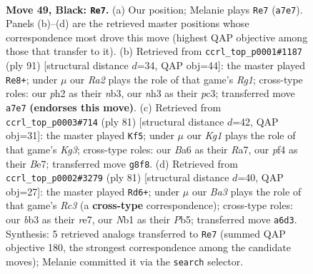 \documentclass[11pt]{article}
\begin{document}
\clearpage

\begin{figure}[p]\centering
\begin{subfigure}{0.46\textwidth}\centering
\resizebox{\linewidth}{!}{%
\newchessgame
\chessboard[
  setfen={6k1/r4p1p/b5p1/4Pp2/5P2/1B5N/P5PP/1n2K3 b - - 7 49},
  showmover=false,
  pgfstyle=straightmove, color=movearrow, markmove={a7-e7}
]}
\caption{}
\end{subfigure}\hfill
\begin{subfigure}{0.46\textwidth}\centering
\resizebox{\linewidth}{!}{%
\newchessgame
\chessboard[
  setfen={2b3r1/p7/2pk4/3p2p1/1P5p/PNP2P2/4K2P/6R1 b - - 13 46},
  showmover=false,
  pgfstyle=straightmove, color=movearrow, markmove={g8-e8}
]}
\caption{}
\end{subfigure}
\\[4pt]
\begin{subfigure}{0.46\textwidth}\centering
\resizebox{\linewidth}{!}{%
\newchessgame
\chessboard[
  setfen={8/r3bp2/1R2p1kp/4P3/p2P3p/2B2P2/3P2P1/5K2 b - - 1 41},
  showmover=false,
  pgfstyle=straightmove, color=movearrow, markmove={g6-f5}
]}
\caption{}
\end{subfigure}\hfill
\begin{subfigure}{0.46\textwidth}\centering
\resizebox{\linewidth}{!}{%
\newchessgame
\chessboard[
  setfen={8/4R1pk/p1r4p/1p3p2/5P2/3K2P1/PP5P/8 b - - 15 41},
  showmover=false,
  pgfstyle=straightmove, color=movearrow, markmove={c6-d6}
]}
\caption{}
\end{subfigure}
\caption{\textbf{Move 49, Black: \texttt{Re7}.} (a) Our position; Melanie plays \texttt{Re7} (\texttt{a7e7}). Panels (b)--(d) are the retrieved master positions whose correspondence most drove this move (highest QAP objective among those that transfer to it). (b) Retrieved from \texttt{ccrl\_top\_p0001\#1187} (ply 91) [structural distance $d$=34, QAP obj=44]: the master played \texttt{Re8+}; under $\mu$ our \emph{Ra2} plays the role of that game's \emph{Rg1}; cross-type roles: our \emph{p}h2 as their \emph{n}b3, our \emph{n}h3 as their \emph{p}c3; transferred move \texttt{a7e7} \textbf{(endorses this move)}. (c) Retrieved from \texttt{ccrl\_top\_p0003\#714} (ply 81) [structural distance $d$=42, QAP obj=31]: the master played \texttt{Kf5}; under $\mu$ our \emph{Kg1} plays the role of that game's \emph{Kg3}; cross-type roles: our \emph{B}a6 as their \emph{R}a7, our \emph{p}f4 as their \emph{B}e7; transferred move \texttt{g8f8}. (d) Retrieved from \texttt{ccrl\_top\_p0002\#3279} (ply 81) [structural distance $d$=40, QAP obj=27]: the master played \texttt{Rd6+}; under $\mu$ our \emph{Ba3} plays the role of that game's \emph{Rc3} (a \textbf{cross-type} correspondence); cross-type roles: our \emph{b}b3 as their \emph{r}e7, our \emph{N}b1 as their \emph{P}b5; transferred move \texttt{a6d3}. Synthesis: 5 retrieved analogs transferred to \texttt{Re7} (summed QAP objective 180, the strongest correspondence among the candidate moves); Melanie committed it via the \texttt{search} selector.}
\label{fig:thought-m97}
\end{figure}
\end{document}
